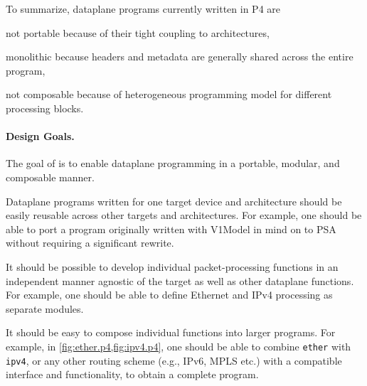 \documentclass[letterpaper,twocolumn,10pt]{article}
\begin{document}
To summarize, dataplane programs currently written in P4 are
\begin{enumerate*}[label=(\roman*)]
  \item not portable because of their tight coupling to architectures,
  \item monolithic because headers and metadata are generally shared
    across the entire program,
  \item not composable because of heterogeneous programming model for
    different processing blocks.
\end{enumerate*}


\paragraph{Design Goals.}
\label{sec:goals}
\label{sec:insights}

The goal of \ulang is to enable dataplane programming in a portable,
modular, and composable manner.

 Dataplane programs written for one target device
and architecture should be easily reusable across other targets and
architectures. For example, one should be able to port a program
originally written with V1Model in mind on to PSA without requiring a
significant rewrite.

 It should be possible to develop individual
packet-processing functions in an independent manner agnostic of the
target as well as other dataplane functions. For example, one should
be able to define Ethernet and IPv4 processing as separate modules.

 It should be easy to compose individual
functions into larger programs. For example, in
\cref{fig:ether.p4,fig:ipv4.p4}, one should be able to combine
\texttt{ether} with \texttt{ipv4}, or any other routing scheme (e.g.,
IPv6, MPLS etc.) with a compatible interface and functionality, to
obtain a complete program.
\end{document}
